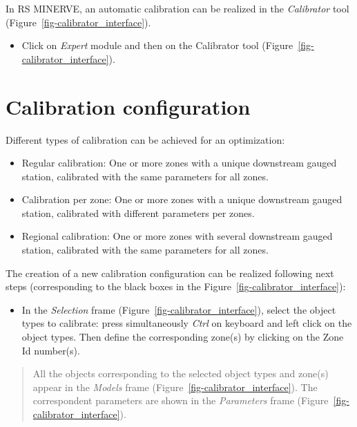 \documentclass[
  letterpaper,
  DIV=11,
  numbers=noendperiod]{scrreprt}
\providecommand{\tightlist}{%
  \setlength{\itemsep}{0pt}\setlength{\parskip}{0pt}}\usepackage{longtable,booktabs,array}
\begin{document}
In RS MINERVE, an automatic calibration can be realized in the
\emph{Calibrator} tool (Figure~\ref{fig-calibrator_interface}).

\begin{itemize}
\tightlist
\item
  {Click on \emph{Expert} module and then on the Calibrator tool
  (Figure~\ref{fig-calibrator_interface}).}
\end{itemize}

\hypertarget{calibration-configuration}{%
\section{Calibration configuration}\label{calibration-configuration}}

Different types of calibration can be achieved for an optimization:

\begin{itemize}
\item
  Regular calibration: One or more zones with a unique downstream gauged
  station, calibrated with the same parameters for all zones.
\item
  Calibration per zone: One or more zones with a unique downstream
  gauged station, calibrated with different parameters per zones.
\item
  Regional calibration: One or more zones with several downstream gauged
  station, calibrated with the same parameters for all zones.
\end{itemize}

The creation of a new calibration configuration can be realized
following next steps (corresponding to the black boxes in the
Figure~\ref{fig-calibrator_interface}):

\begin{itemize}
\tightlist
\item
  {In the \emph{Selection} frame
  (Figure~\ref{fig-calibrator_interface}), select the object types to
  calibrate: press simultaneously \emph{Ctrl} on keyboard and left click
  on the object types. Then define the corresponding zone(s) by clicking
  on the Zone Id number(s).}
\end{itemize}

\begin{quote}
All the objects corresponding to the selected object types and zone(s)
appear in the \emph{Models} frame
(Figure~\ref{fig-calibrator_interface}). The correspondent parameters
are shown in the \emph{Parameters} frame
(Figure~\ref{fig-calibrator_interface}).
\end{quote}
\end{document}

